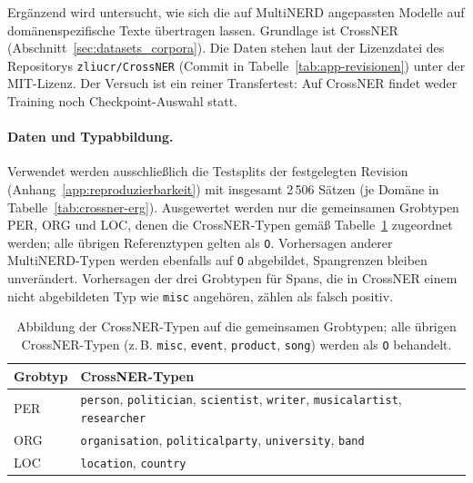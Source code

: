 Ergänzend wird untersucht, wie sich die auf MultiNERD angepassten Modelle
auf domänenspezifische Texte übertragen lassen.
Grundlage ist CrossNER~\cite{liu2021crossner}
(Abschnitt~\ref{sec:datasets_corpora}).
Die Daten stehen laut der Lizenzdatei des Repositorys
\texttt{zliucr/CrossNER} (Commit in Tabelle~\ref{tab:app-revisionen})
unter der MIT-Lizenz.
Der Versuch ist ein reiner Transfertest: Auf CrossNER findet weder
Training noch Checkpoint-Auswahl statt.

\paragraph{Daten und Typabbildung.}
Verwendet werden ausschließlich die Testsplits der festgelegten Revision
(Anhang~\ref{app:reproduzierbarkeit}) mit insgesamt
2\,506 Sätzen (je Domäne in Tabelle~\ref{tab:crossner-erg}).
Ausgewertet werden nur die gemeinsamen Grobtypen PER, ORG und LOC, denen
die CrossNER-Typen gemäß Tabelle~\ref{tab:crossner-mapping} zugeordnet
werden; alle übrigen Referenztypen gelten als \texttt{O}.
Vorhersagen anderer MultiNERD-Typen werden ebenfalls auf \texttt{O}
abgebildet, Spangrenzen bleiben unverändert.
Vorhersagen der drei Grobtypen für Spans, die in CrossNER einem nicht
abgebildeten Typ wie \texttt{misc} angehören, zählen als falsch positiv.

\begin{table}[ht]
  \centering
  \small
  \caption[Abbildung der CrossNER-Typen auf die gemeinsamen Grobtypen]{Abbildung der CrossNER-Typen auf die gemeinsamen Grobtypen;
  alle übrigen CrossNER-Typen (z.\,B. \texttt{misc}, \texttt{event},
  \texttt{product}, \texttt{song}) werden als \texttt{O} behandelt.}
  \label{tab:crossner-mapping}
  \begin{tabularx}{\linewidth}{@{}lX@{}}
    \toprule
    \textbf{Grobtyp} & \textbf{CrossNER-Typen} \\
    \midrule
    PER & \texttt{person}, \texttt{politician}, \texttt{scientist},
      \texttt{writer}, \texttt{musicalartist}, \texttt{researcher} \\
    \addlinespace
    ORG & \texttt{organisation}, \texttt{politicalparty},
      \texttt{university}, \texttt{band} \\
    \addlinespace
    LOC & \texttt{location}, \texttt{country} \\
    \bottomrule
  \end{tabularx}
\end{table}

